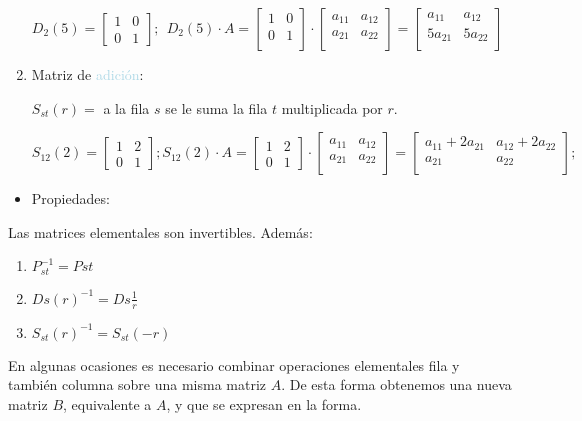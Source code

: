 \documentclass[12pt]{article}
\begin{document}
\begin{enumerate}
    $D_2(5)=\begin{bmatrix}
        1 & 0 \\
        0 & 1
    \end{bmatrix}; ~~D_2(5)\cdot A=\begin{bmatrix}
        1 & 0\\
        0 & 1\\
    \end{bmatrix}\cdot    \begin{bmatrix}
        a_{11} & a_{12}\\
        a_{21} & a_{22}\\
    \end{bmatrix}
    =    \begin{bmatrix}
        a_{11} & a_{12}\\
        5a_{21} & 5a_{22}\\
    \end{bmatrix}$

    \item Matriz de \textcolor{lightblue}{adición}:
    
$S_{st}(r)=$ a la fila $s$ se le suma la fila $t$ multiplicada
por $r$.

    $S_{12}(2)=\begin{bmatrix}
        1 & 2\\
        0 & 1 
    \end{bmatrix}; S_{12}(2)\cdot A=\begin{bmatrix}
        1 & 2\\
        0 & 1
    \end{bmatrix}\cdot    \begin{bmatrix}
        a_{11} & a_{12}\\
        a_{21} & a_{22}\\
    \end{bmatrix}=    \begin{bmatrix}
        a_{11}+2a_{21} & a_{12}+2a_{22}\\
        a_{21} & a_{22}\\
    \end{bmatrix};$
\end{enumerate}
\begin{itemize}[label=\color{red}\textbullet, leftmargin=*]
    \item \color{lightblue} Propiedades:
\end{itemize}
Las matrices elementales son invertibles. Además:
\begin{enumerate}[label=\arabic*)]
    \item $P_{st}^{-1}=Pst$
    \item $Ds(r)^{-1}=Ds\frac{1}{r}$
    \item $S_{st}(r)^{-1}=S_{st}(-r)$
\end{enumerate}
En algunas ocasiones es necesario combinar operaciones
elementales fila y también columna sobre una misma matriz $A$.
De esta forma obtenemos una nueva matriz $B$, equivalente a $A$,
y que se expresan en la forma.
\end{document}
